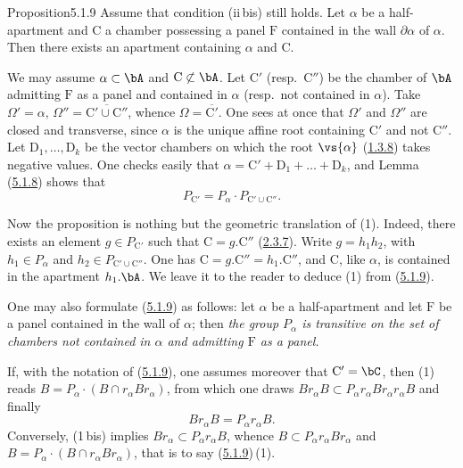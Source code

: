 \documentclass[12pt,a4paper,oneside,english]{smfart}
\makeatletter
\newcommand{\btanchor}[1]{\leavevmode\Hy@raisedlink{\hypertarget{bt:#1}{}}}
\newcommand{\btpageanchor}[1]{\Hy@raisedlink{\hypertarget{p:#1}{}}}
\newcommand{\btref}[1]{\hyperlink{bt:#1}{#1}}
\newcommand{\btpage}[1]{\marginnote{p.~#1}\btpageanchor{#1}}
\newcommand{\pg}[1]{\btpage{#1}}
\theoremstyle{definition}
\theoremstyle{bt}
\makeatother
\begin{document}
\begin{btstat}{Proposition}{5.1.9}\btanchor{5.1.9}
Assume that condition \textup{(ii\,bis)} still holds. Let $\alpha$ be a
half-apartment and $\mathrm{C}$ a chamber possessing a panel $\mathrm{F}$
contained in the wall $\partial\alpha$ of $\alpha$. Then there exists an
apartment containing $\alpha$ and $\mathrm{C}$.
\end{btstat}

We may assume $\alpha\subset\bA$ and $\mathrm{C}\not\subset\bA$. Let
$\mathrm{C}'$ (resp.\ $\mathrm{C}''$) be the chamber of $\bA$ admitting
$\mathrm{F}$ as a panel and contained in $\alpha$ (resp.\ not contained in
$\alpha$). Take $\Omega'=\alpha$, $\Omega''=\overline{\mathrm{C}'\cup\mathrm{C}''}$,
whence $\Omega=\overline{\mathrm{C}'}$. One sees at once that $\Omega'$ and
$\Omega''$ are closed and transverse, since $\alpha$ is the unique affine root
containing $\mathrm{C}'$ and not $\mathrm{C}''$. Let
$\mathrm{D}_{1},\dots,\mathrm{D}_{k}$ be the vector chambers on which the root
$\vs{\alpha}$ (\btref{1.3.8}) takes negative values. One checks easily that
$\alpha=\mathrm{C}'+\mathrm{D}_{1}+\dots+\mathrm{D}_{k}$, and Lemma (\btref{5.1.8})
shows that
\begin{equation*}
P_{\mathrm{C}'}=P_{\alpha}\cdot P_{\mathrm{C}'\cup\mathrm{C}''}.\tag{1}
\end{equation*}

Now the proposition is nothing but the geometric translation of (1). Indeed,
there exists an element $g\in P_{\mathrm{C}'}$ such that
$\mathrm{C}=g.\mathrm{C}''$ (\btref{2.3.7}). Write $g=h_{1}h_{2}$, with
$h_{1}\in P_{\alpha}$ \pg{86} and $h_{2}\in P_{\mathrm{C}'\cup\mathrm{C}''}$.
One has $\mathrm{C}=g.\mathrm{C}''=h_{1}.\mathrm{C}''$, and $\mathrm{C}$, like
$\alpha$, is contained in the apartment $h_{1}.\bA$. We leave it to the reader
to deduce (1) from (\btref{5.1.9}).

\btanchor{5.1.10}
One may also formulate (\btref{5.1.9}) as follows: let $\alpha$ be a half-apartment and
let $\mathrm{F}$ be a panel contained in the wall of $\alpha$; then \emph{the
group $P_{\alpha}$ is transitive on the set of chambers not contained in
$\alpha$ and admitting $\mathrm{F}$ as a panel.}

If, with the notation of (\btref{5.1.9}), one assumes moreover that
$\mathrm{C}'=\bC$, then (1) reads $B=P_{\alpha}\cdot(B\cap r_{\alpha}Br_{\alpha})$,
from which one draws $Br_{\alpha}B\subset P_{\alpha}r_{\alpha}Br_{\alpha}r_{\alpha}B$
and finally
\begin{equation*}
Br_{\alpha}B=P_{\alpha}r_{\alpha}B.\tag{1\,bis}
\end{equation*}
Conversely, (1\,bis) implies $Br_{\alpha}\subset P_{\alpha}r_{\alpha}B$, whence
$B\subset P_{\alpha}r_{\alpha}Br_{\alpha}$ and
$B=P_{\alpha}\cdot(B\cap r_{\alpha}Br_{\alpha})$, that is to say (\btref{5.1.9})\,(1).
\end{document}
